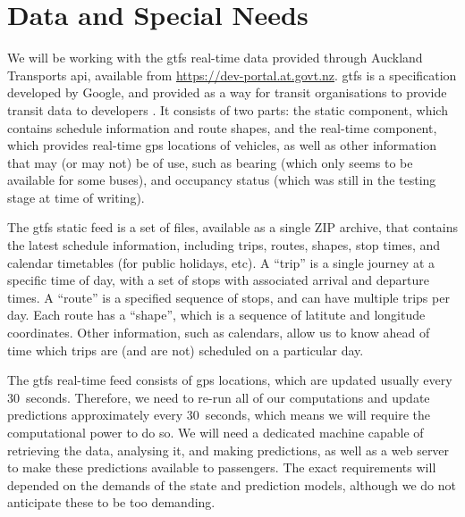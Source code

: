 \documentclass[12pt,a4paper]{article}
\begin{document}
\section{Data and Special Needs}
\label{sec:data}

We will be working with the \gls{gtfs} real-time data provided through Auckland Transports
\gls{api}, available from \url{https://dev-portal.at.govt.nz}.
\gls{gtfs} is a specification developed by Google,
and provided as a way for transit organisations to provide transit data to developers
\citep{gtfs}.
It consists of two parts: the static component, which contains schedule information and route shapes,
and the real-time component, which provides real-time \gls{gps} locations of vehicles,
as well as other information that may (or may not) be of use,
such as bearing (which only seems to be available for some buses),
and occupancy status (which was still in the testing stage at time of writing).


The \gls{gtfs} static feed is a set of files, available as a single ZIP archive,
that contains the latest schedule information, including trips, routes, shapes, stop times,
and calendar timetables (for public holidays, etc).
A ``trip'' is a single journey at a specific time of day,
with a set of stops with associated arrival and departure times.
A ``route'' is a specified sequence of stops,
and can have multiple trips per day.
Each route has a ``shape'', which is a sequence of latitute and longitude coordinates.
Other information, such as calendars, allow us to know ahead of time which trips
are (and are not) scheduled on a particular day.


The \gls{gtfs} real-time feed consists of \gls{gps} locations,
which are updated usually every 30~seconds.
Therefore, we need to re-run all of our computations and update predictions approximately
every 30~seconds, which means we will require the computational power to do so.
We will need a dedicated machine capable of
retrieving the data, analysing it, and making predictions,
as well as a web server to make these predictions available to passengers.
The exact requirements will depended on the demands of the state and prediction models,
although we do not anticipate these to be too demanding.



\end{document}
